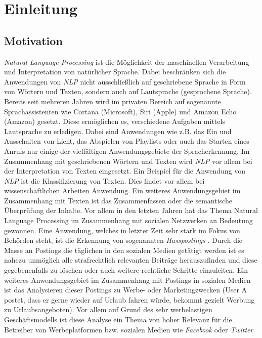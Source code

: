 \chapter{Einleitung}
\label{cha:Introduction}

\section{Motivation}
\textit{Natural Language Processing} ist die Möglichkeit der maschinellen Verarbeitung und Interpretation von natürlicher Sprache. Dabei beschränken sich die Anwendungen von \textit{NLP} nicht ausschließlich auf geschriebene Sprache in Form von Wörtern und Texten, sondern auch auf Lautsprache (gesprochene Sprache). Bereits seit mehreren Jahren wird im privaten Bereich auf sogenannte Sprachassistenten wie Cortana (Microsoft), Siri (Apple) und Amazon Echo (Amazon) gesetzt. Diese ermöglichen es, verschiedene Aufgaben mittels Lautsprache zu erledigen. Dabei sind Anwendungen wie z.B. das Ein und Ausschalten von Licht, das Abspielen von Playlists oder auch das Starten eines Anrufs nur einige der vielfältigen Anwendungsgebiete der Spracherkennung. Im Zusammenhang mit geschriebenen Wörtern und Texten wird \textit{NLP} vor allem bei der Interpretation von Texten eingesetzt. Ein Beispiel für die Anwendung von \textit{NLP} ist die Klassifizierung von Texten. Dies findet vor allem bei wissenschaftlichen Arbeiten Anwendung. Ein weiteres Anwendungsgebiet im Zusammenhang mit Texten ist das Zusammenfassen oder die semantische Überprüfung der Inhalte. Vor allem in den letzten Jahren hat das Thema Natural Language Processing im Zusammenhang mit sozialen Netzwerken an Bedeutung gewonnen. Eine Anwendung, welches in letzter Zeit sehr stark im Fokus von Behörden steht, ist die Erkennung von sogenannten \textit{Hasspostings} \cite{Nobata2016}. Durch die Masse an Postings die täglichen in den sozialen Medien getätigt werden ist es nahezu unmöglich alle strafrechtlich relevanten Beiträge herauszufinden und diese gegebenenfalls zu löschen oder auch weitere rechtliche Schritte einzuleiten. Ein weiteres Anwendungsgebiet im Zusammenhang mit Postings in sozialen Medien ist das Analysieren dieser Postings zu Werbe- oder Marketingzwecken (User A postet, dass er gerne wieder auf Urlaub fahren würde, bekommt gezielt Werbung zu Urlaubsangeboten). Vor allem auf Grund des sehr werbelastigen Geschäftsmodells ist diese Analyse ein Thema von hoher Relevanz für die Betreiber von Werbeplatformen bzw. sozialen Medien wie \textit{Facebook} oder \textit{Twitter}.

